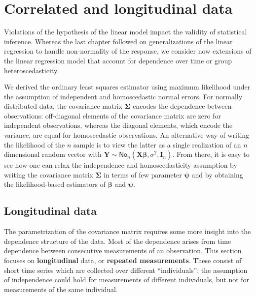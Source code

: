 \documentclass[
  11pt,
  letterpaper,
]{book}
\theoremstyle{definition}
\theoremstyle{definition}
\theoremstyle{definition}
\theoremstyle{definition}
\theoremstyle{remark}
\begin{document}
\hypertarget{correlated-longitudinal-data}{%
\chapter{Correlated and longitudinal data}\label{correlated-longitudinal-data}}

Violations of the hypothesis of the linear model impact the validity of statistical inference. Whereas the last chapter followed on generalizations of the linear regression to handle non-normality of the response, we consider now extensions of the linear regression model that account for dependence over time or group heteroscedasticity.

We derived the ordinary least squares estimator using maximum likelihood under the assumption of independent and homoscedastic normal errors. For normally distributed data, the covariance matrix \(\boldsymbol{\Sigma}\) encodes the dependence between observations: off-diagonal elements of the covariance matrix are zero for independent observations, whereas the diagonal elements, which encode the variance, are equal for homoscedastic observations. An alternative way of writing the likelihood of the \(n\) sample is to view the latter as a single realization of an \(n\) dimensional random vector with \(\boldsymbol{Y} \sim \mathsf{No}_n(\mathbf{X}\boldsymbol{\beta}, \sigma^2, \mathbf{I}_n)\). From there, it is easy to see how one can relax the independence and homoscedasticity assumption by writing the covariance matrix \(\boldsymbol{\Sigma}\) in terms of few parameter \(\boldsymbol{\psi}\) and by obtaining the likelihood-based estimators of \(\boldsymbol{\beta}\) and \(\boldsymbol{\psi}\).

\hypertarget{longitudinal-data}{%
\section{Longitudinal data}\label{longitudinal-data}}

The parametrization of the covariance matrix requires some more insight into the dependence structure of the data. Most of the dependence arises from time dependence between consecutive measurements of an observation. This section focuses on \textbf{longitudinal} data, or \textbf{repeated measurements}. These consist of short time series which are collected over different ``individuals'': the assumption of independence could hold for measurements of different individuals, but not for measurements of the same individual.
\end{document}
